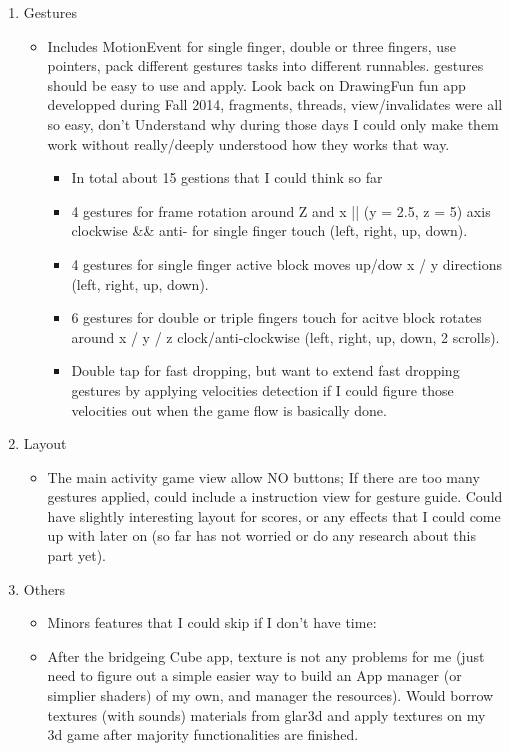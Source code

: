 \documentclass[9pt,b5paper]{article}
\begin{document}
\begin{enumerate}
\item Gestures
\label{sec-1-1-1-3}
\begin{itemize}
\item Includes MotionEvent for single finger, double or three fingers, use pointers, pack different gestures tasks into different runnables. gestures should be easy to use and apply. Look back on DrawingFun fun app developped during Fall 2014, fragments, threads, view/invalidates were all so easy, don't Understand why during those days I could only make them work without really/deeply understood how they works that way.
\begin{itemize}
\item In total about 15 gestions that I could think so far
\item 4 gestures for frame rotation around Z and x || (y = 2.5, z = 5) axis clockwise \&\& anti- for single finger touch (left, right, up, down).
\item 4 gestures for single finger active block moves up/dow x / y directions (left, right, up, down).
\item 6 gestures for double or triple fingers touch for acitve block rotates around x / y / z clock/anti-clockwise (left, right, up, down, 2 scrolls).
\item Double tap for fast dropping, but want to extend fast dropping gestures by applying velocities detection if I could figure those velocities out when the game flow is basically done.
\end{itemize}
\end{itemize}
\item Layout
\label{sec-1-1-1-4}
\begin{itemize}
\item The main activity game view allow NO buttons; If there are too many gestures applied, could include a instruction view for gesture guide. Could have slightly interesting layout for scores, or any effects that I could come up with later on (so far has not worried or do any research about this part yet).
\end{itemize}
\item Others
\label{sec-1-1-1-5}
\begin{itemize}
\item Minors features that I could skip if I don't have time:
\item After the bridgeing Cube app, texture is not any problems for me (just need to figure out a simple easier way to build an App manager (or simplier shaders) of my own, and manager the resources). Would borrow textures (with sounds) materials from glar3d and apply textures on my 3d game after majority functionalities are finished.

\end{itemize}
\end{enumerate}
\end{document}
